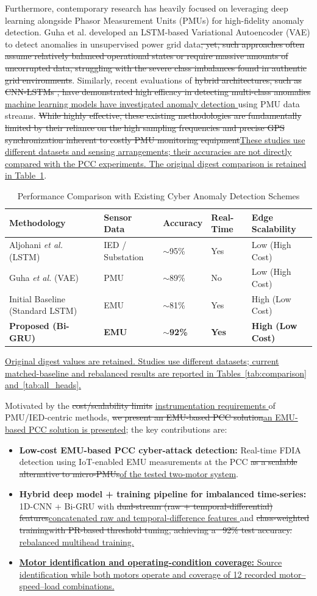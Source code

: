 \documentclass[conference,onecolumn,letterpaper]{IEEEtran} %
\providecommand{\DIFadd}[1]{{\protect\color{blue} \sf #1}} %
\providecommand{\DIFdel}[1]{{\protect\color{red} \scriptsize #1}} %
\providecommand{\DIFaddbegin}{} %
\providecommand{\DIFaddend}{} %
\providecommand{\DIFdelbegin}{} %
\providecommand{\DIFdelend}{} %
\renewcommand{\DIFadd}[1]{{\protect\color{blue}\protect\uline{#1}}}
\renewcommand{\DIFdel}[1]{{\protect\color{red}\protect\sout{#1}}}
\newcommand{\APECRequestedLiteratureTable}{%
\begin{table}[!t]
\centering
\caption{Performance Comparison with Existing Cyber Anomaly Detection Schemes}
\label{tab:prior_work}
\small
\setlength{\tabcolsep}{2pt}
\begin{tabular}{|p{.245\linewidth}|>{\centering\arraybackslash}p{.17\linewidth}|>{\centering\arraybackslash}p{.15\linewidth}|>{\centering\arraybackslash}p{.115\linewidth}|>{\centering\arraybackslash}p{.20\linewidth}|}
\hline
\textbf{Methodology} & \textbf{Sensor Data} & \textbf{Accuracy} & \textbf{Real-Time} & \textbf{Edge Scalability} \\
\hline
Aljohani \textit{et al.} \cite{aljohani2024} (LSTM) & IED / Substation & $\sim$95\% & Yes & Low (High Cost) \\
\hline
Guha \textit{et al.} \cite{guha} (VAE) & PMU & $\sim$89\% & No & Low (High Cost) \\
\hline
Initial Baseline (Standard LSTM) & EMU & $\sim$81\% & Yes & High (Low Cost) \\
\hline
\textbf{Proposed (Bi-GRU)} & \textbf{EMU} & \textbf{$\sim$92\%} & \textbf{Yes} & \textbf{High (Low Cost)} \\
\hline
\end{tabular}
\par\vspace{2pt}
\begin{minipage}{\linewidth}\footnotesize \DIFadd{Original digest values are retained. Studies use different datasets; current matched-baseline and rebalanced results are reported in Tables~\mbox{\ref{tab:comparison}} and~\mbox{\ref{tab:all_heads}}.}\end{minipage}
\end{table}
}
\begin{document}
Furthermore, contemporary research has heavily focused on leveraging deep learning alongside Phasor Measurement Units (PMUs) for high-fidelity anomaly detection. Guha et al. \mbox{\cite{guha}} developed an LSTM-based Variational Autoencoder (VAE) to detect anomalies in unsupervised power grid data\DIFdelbegin \DIFdel{; yet, such approaches often assume relatively balanced operational states or require massive amounts of uncorrupted data, struggling with the severe class imbalances found in authentic grid environments}\DIFdelend . Similarly, recent evaluations of \DIFdelbegin \DIFdel{hybrid architectures, such as CNN-LSTMs \mbox{\cite{pmu_lstm_2025}} , have demonstrated high efficacy in detecting multi-class anomalies }\DIFdelend \DIFaddbegin \DIFadd{machine learning models \mbox{\cite{pmu_lstm_2025}} have investigated anomaly detection }\DIFaddend using PMU data streams. \DIFdelbegin \DIFdel{While highly effective, these existing methodologies are fundamentally limited by their reliance on the high sampling frequencies and precise GPS synchronization inherent to costly PMU monitoring equipment}\DIFdelend \DIFaddbegin \DIFadd{These studies use different datasets and sensing arrangements; their accuracies are not directly compared with the PCC experiments. The original digest comparison is retained in Table~\mbox{\ref{tab:prior_work}}}\DIFaddend .

\APECRequestedLiteratureTable{}

Motivated by the \DIFdelbegin \DIFdel{cost/scalability limits }\DIFdelend \DIFaddbegin \DIFadd{instrumentation requirements }\DIFaddend of PMU/IED-centric methods, \DIFdelbegin \DIFdel{we present an EMU-based PCC solution}\DIFdelend \DIFaddbegin \DIFadd{an EMU-based PCC solution is presented}\DIFaddend ; the key contributions are:
\begin{itemize}
    \item \textbf{Low-cost EMU-based PCC cyber-attack detection:} Real-time FDIA detection using IoT-enabled EMU measurements at the PCC \DIFdelbegin \DIFdel{as a scalable alternative to micro-PMUs}\DIFdelend \DIFaddbegin \DIFadd{of the tested two-motor system}\DIFaddend .
    \item \textbf{Hybrid deep model + training pipeline for imbalanced time-series:} 1D-CNN + Bi-GRU with \DIFdelbegin \DIFdel{dual-stream (raw + temporal-differential) features}\DIFdelend \DIFaddbegin \DIFadd{concatenated raw and temporal-difference features }\DIFaddend  and \DIFdelbegin \DIFdel{class-weighted trainingwith PR-based threshold tuning, achieving a ~92\% test accuracy.
    }\DIFdelend \DIFaddbegin \DIFadd{rebalanced multihead training.
    }\item \DIFadd{\textbf{Motor identification and operating-condition coverage:} Source identification while both motors operate and coverage of 12 recorded motor--speed--load combinations.
}\DIFaddend \end{itemize}
\end{document}
